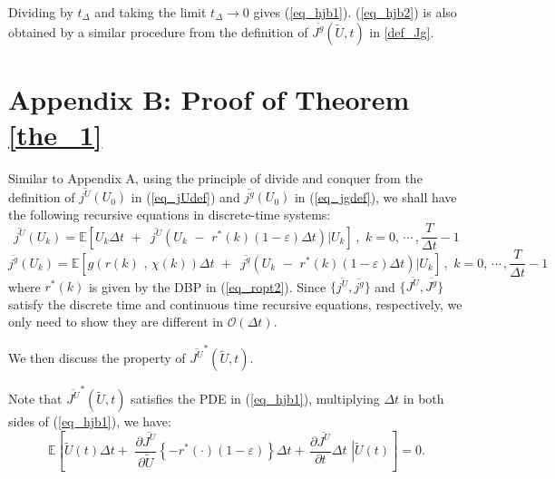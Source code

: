 \documentclass[11pt,journal, onecolumn]{./IEEEtran}
\newcommand{\red}{\color{black}}
\begin{document}
Dividing by $t_\Delta$ and taking the limit $t_\Delta \rightarrow 0$ gives (\ref{eq_hjb1}). (\ref{eq_hjb2}) is also obtained by a similar procedure from the definition of $\overline {{J^g}} (\widetilde U,t)$ in \eqref{def_Jg}.


\section*{Appendix B: Proof of Theorem \ref{the_1}}\label{app_the_1}
{\red Similar to Appendix A, using the principle of divide and conquer from the definition of $\overline{j^U}(U_0)$ in (\ref{eq_jUdef}) and $\overline{j^g}(U_0)$ in (\ref{eq_jgdef}), we shall have the following recursive equations in discrete-time systems:
\begin{equation}\label{jU_rec}
\overline {j_{}^U} \left( {{U_k}} \right) = \mathbb E\left[ {{U_k}\Delta t\,\, + \,\,\,\overline {j_{}^U} \left( {{U_k}\,\, - \,\,{r^*}(k)(1 - {\varepsilon})\Delta t} \right)\left| {{U_k}} \right.} \right]\,,\,\,k = 0,\, \cdots \,,\frac{T}{\Delta t} - 1
\end{equation}
\begin{equation}\label{jg_rec}
\overline {j_{}^g} \left( {{U_k}} \right) = \mathbb  E\left[ {g\left( {r(k)\,\,,\,\chi (k)} \right)\Delta t\,\, + \,\,\,\overline {j_{}^g} \left( {{U_k}\,\, - \,\,{r^*}(k)(1 - {\varepsilon})\Delta t} \right)\left| {{U_k}} \right.} \right]\,,\,\,k = 0,\, \cdots \,,\frac{T}{\Delta t}- 1
\end{equation}
where $r^*(k)$ is given by the DBP in (\ref{eq_ropt2}). Since $\{\overline {j^U},\overline {j^g}\}$ and $\{\overline {J^U},\overline {J^g}\}$ satisfy the discrete time and continuous time recursive equations, respectively, we only need to show they are different in $\mathcal{O}(\Delta t)$.

We then discuss the property of $\overline {J^U}^*(\widetilde U,t)$.} Note that $\overline {J^U}^*(\widetilde U,t)$ satisfies the PDE in (\ref{eq_hjb1}), multiplying $\Delta t$ in both sides of (\ref{eq_hjb1}), we have:
\begin{equation}\label{eq_PDEd}
\mathbb E\left[ {\widetilde U(t)\Delta t + \,\,\frac{{\partial \overline {{J^U}} }}{{\partial \widetilde U}}\left\{ { - {r^*}( \cdot )(1 - \varepsilon )} \right\}\Delta t + \,\frac{{\partial \overline {{J^U}} }}{{\partial t}}\Delta t\,\,\left| {\widetilde U(t)} \right.} \right] = 0.
\end{equation}
\end{document}
